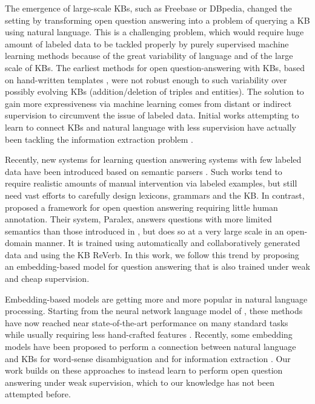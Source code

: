 \documentclass[runningheads,a4paper]{llncs}
\newcommand{\dbp}{{\sc DBpedia}\xspace}
\newcommand{\fb}{{\sc Freebase}\xspace}
\newcommand{\rv}{{\sc ReVerb}\xspace}
\begin{document}
The emergence of large-scale KBs, such as \fb \cite{bollacker2008freebase} or \dbp \cite{dbpedia-swj}, changed the setting by transforming open question answering into a problem of querying a KB using natural language.
This is a challenging problem, which would  require huge amount of labeled data to be tackled properly by purely supervised machine learning methods because of the great variability of language and of the large scale of KBs.
The earliest methods for open question-answering with KBs, based on hand-written templates \cite{yahya2012natural,unger2012template}, were not robust enough to such variability over possibly evolving KBs (addition/deletion of triples and entities).
The solution to gain more expressiveness via machine learning comes from distant or indirect supervision to circumvent the issue of labeled data.
Initial works attempting to learn to connect KBs and natural language with less supervision have actually been tackling the information extraction problem \cite{mintz2009distant,hoffmann2011knowledge,lao2012reading,riedel2013relation}.

Recently, new systems for learning question answering systems with few labeled data have been introduced
based on semantic parsers \cite{cai-yates:2013:ACL2013,berant-EtAl:2013:EMNLP,kwiatkowski-EtAl:2013:EMNLP}. Such works tend to require realistic amounts of manual intervention via labeled examples, but still need vast efforts to carefully design lexicons, grammars and the KB.
In contrast, \cite{paralex} proposed a framework for open question answering requiring little human annotation. 
Their system, {\sc Paralex}, answers questions with more limited semantics than those introduced in \cite{berant-EtAl:2013:EMNLP,kwiatkowski-EtAl:2013:EMNLP}, but does so at a very large scale in an open-domain manner. It is trained using automatically and collaboratively generated data and using the KB \rv \cite{ReVerb2011}.
In this work, we follow this trend by proposing an embedding-based model for question answering that is 
also trained under weak and cheap supervision.



Embedding-based models are getting more and more popular in natural language processing.
Starting from the neural network language model of \cite{bengio03}, these methods have now reached near state-of-the-art performance on many standard tasks while usually requiring less hand-crafted features \cite{collobert:2011b,socher2013recursive}.
Recently, some embedding models have been proposed to perform a connection between natural language and KBs for word-sense disambiguation \cite{bordes:12aistats} and for information extraction \cite{weston-EtAl:2013:EMNLP}. 
Our work builds on these approaches to instead learn to perform open question answering under weak supervision, which to our knowledge has not been attempted before.
\end{document}
